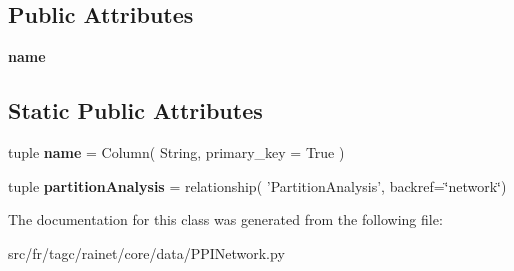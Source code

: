 \subsection*{Public Attributes}
\begin{DoxyCompactItemize}
\item 
\hypertarget{classsrc_1_1fr_1_1tagc_1_1rainet_1_1core_1_1data_1_1PPINetwork_1_1PPINetwork_a8d6bb23b40cf0f866740b494709a427c}{{\bfseries name}}\label{classsrc_1_1fr_1_1tagc_1_1rainet_1_1core_1_1data_1_1PPINetwork_1_1PPINetwork_a8d6bb23b40cf0f866740b494709a427c}

\end{DoxyCompactItemize}
\subsection*{Static Public Attributes}
\begin{DoxyCompactItemize}
\item 
\hypertarget{classsrc_1_1fr_1_1tagc_1_1rainet_1_1core_1_1data_1_1PPINetwork_1_1PPINetwork_a1c4b476ee23a7a5526164bcd94f2c3c7}{tuple {\bfseries name} = Column( String, primary\-\_\-key = True )}\label{classsrc_1_1fr_1_1tagc_1_1rainet_1_1core_1_1data_1_1PPINetwork_1_1PPINetwork_a1c4b476ee23a7a5526164bcd94f2c3c7}

\item 
\hypertarget{classsrc_1_1fr_1_1tagc_1_1rainet_1_1core_1_1data_1_1PPINetwork_1_1PPINetwork_ab939289fe5aaae7822834877f8fa84b0}{tuple {\bfseries partition\-Analysis} = relationship( 'Partition\-Analysis', backref=\char`\"{}network\char`\"{})}\label{classsrc_1_1fr_1_1tagc_1_1rainet_1_1core_1_1data_1_1PPINetwork_1_1PPINetwork_ab939289fe5aaae7822834877f8fa84b0}

\end{DoxyCompactItemize}


The documentation for this class was generated from the following file\-:\begin{DoxyCompactItemize}
\item 
src/fr/tagc/rainet/core/data/P\-P\-I\-Network.\-py\end{DoxyCompactItemize}
